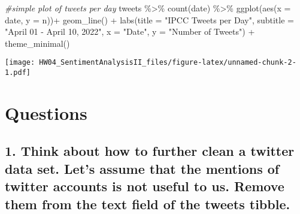 \documentclass[
]{article}
\newenvironment{Shaded}{\begin{snugshade}}{\end{snugshade}}
\newcommand{\AttributeTok}[1]{\textcolor[rgb]{0.77,0.63,0.00}{#1}}
\newcommand{\CommentTok}[1]{\textcolor[rgb]{0.56,0.35,0.01}{\textit{#1}}}
\newcommand{\FunctionTok}[1]{\textcolor[rgb]{0.00,0.00,0.00}{#1}}
\newcommand{\NormalTok}[1]{#1}
\newcommand{\SpecialCharTok}[1]{\textcolor[rgb]{0.00,0.00,0.00}{#1}}
\newcommand{\StringTok}[1]{\textcolor[rgb]{0.31,0.60,0.02}{#1}}
\begin{document}
\begin{Shaded}
\begin{Highlighting}[]
\CommentTok{\#simple plot of tweets per day}
\NormalTok{tweets }\SpecialCharTok{\%\textgreater{}\%}
  \FunctionTok{count}\NormalTok{(date) }\SpecialCharTok{\%\textgreater{}\%}
  \FunctionTok{ggplot}\NormalTok{(}\FunctionTok{aes}\NormalTok{(}\AttributeTok{x =}\NormalTok{ date, }\AttributeTok{y =}\NormalTok{ n))}\SpecialCharTok{+}
  \FunctionTok{geom\_line}\NormalTok{() }\SpecialCharTok{+}
  \FunctionTok{labs}\NormalTok{(}\AttributeTok{title =} \StringTok{"IPCC Tweets per Day"}\NormalTok{,}
       \AttributeTok{subtitle =} \StringTok{"April 01 {-} April 10, 2022"}\NormalTok{,}
       \AttributeTok{x =} \StringTok{"Date"}\NormalTok{,}
       \AttributeTok{y =} \StringTok{"Number of Tweets"}\NormalTok{) }\SpecialCharTok{+}
  \FunctionTok{theme\_minimal}\NormalTok{()}
\end{Highlighting}
\end{Shaded}

\texttt{[image: HW04\_SentimentAnalysisII\_files/figure-latex/unnamed-chunk-2-1.pdf]}

\hypertarget{questions}{%
\section{Questions}\label{questions}}

\hypertarget{think-about-how-to-further-clean-a-twitter-data-set.-lets-assume-that-the-mentions-of-twitter-accounts-is-not-useful-to-us.-remove-them-from-the-text-field-of-the-tweets-tibble.}{%
\subsection{1. Think about how to further clean a twitter data set.
Let's assume that the mentions of twitter accounts is not useful to us.
Remove them from the text field of the tweets
tibble.}\label{think-about-how-to-further-clean-a-twitter-data-set.-lets-assume-that-the-mentions-of-twitter-accounts-is-not-useful-to-us.-remove-them-from-the-text-field-of-the-tweets-tibble.}}
\end{document}
